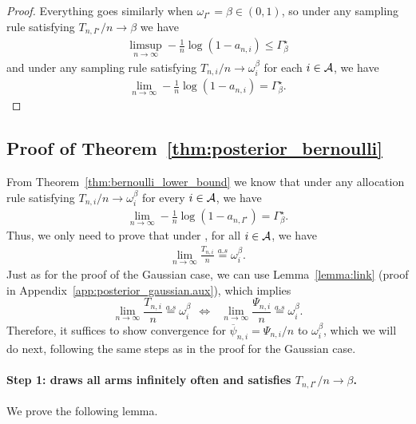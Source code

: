 \begin{proof}
Everything goes similarly when $\omega_{I^\star} = \beta \in (0,1)$, so under any sampling rule satisfying $T_{n,I^\star} / n \rightarrow \beta$ we have
\begin{align*}
\limsup_{n \rightarrow \infty} - \frac{1}{n} \log (1 - a_{n,i}) \leq \Gamma_{\beta}^\star
\end{align*}
and under any sampling rule satisfying $T_{n,i} / n \rightarrow \omega_i^\beta$ for each $i \in \mathcal{A}$, we have
\begin{align*}
\lim_{n \rightarrow \infty} - \frac{1}{n} \log (1 - a_{n,i}) = \Gamma_{\beta}^\star.
\end{align*}

\end{proof}

\subsection{Proof of Theorem~\ref{thm:posterior_bernoulli}}\label{app:posterior_beta.main}

\restateposteriorbernoulli*

From Theorem~\ref{thm:bernoulli_lower_bound} we know that under any allocation rule satisfying $T_{n,i} / n \rightarrow \omega_i^\beta$ for every $i \in \mathcal{A}$, we have
	\begin{align*}
		\lim_{n \rightarrow \infty} - \frac{1}{n} \log \left( 1 - a_{n,I^\star} \right) = \Gamma_{\beta}^\star.
	\end{align*}
Thus, we only need to prove that under \TTTS, for all $i \in \mathcal{A}$, we have
	\begin{align*}
		\lim_{n \rightarrow \infty} \frac{T_{n,i}}{n} \overset{a.s}{=} \omega_i^\beta.
	\end{align*}
Just as for the proof of the Gaussian case, we can use Lemma~\ref{lemma:link} (proof in Appendix~\ref{app:posterior_gaussian.aux}), which implies 
\[
    \lim_{n\rightarrow \infty} \frac{T_{n,i}}{n}  \overset{a.s}{=} \omega_i^\beta \ \ \Leftrightarrow \ \ \ \lim_{n\rightarrow \infty} \frac{\Psi_{n,i}}{n}  \overset{a.s}{=} \omega_i^\beta.
\]
Therefore, it suffices to show convergence for $\overline{\psi}_{n,i} = \Psi_{n,i}/n$ to $\omega_i^\beta$, which we will do next, following the same steps as in the proof for the Gaussian case. 
	
\paragraph{Step 1: \TTTS draws all arms infinitely often and satisfies $T_{n,I^\star}/n \rightarrow \beta$.} We prove the following lemma. 
	
